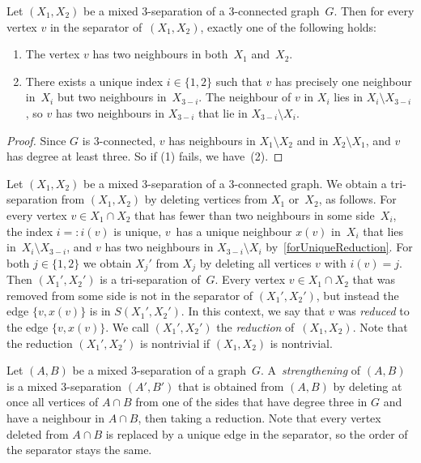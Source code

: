 \documentclass{aic}
\theoremstyle{plain}
\theoremstyle{definition}
\theoremstyle{plain}
\theoremstyle{plain}
\newcommand{\sm}{\setminus}
\begin{document}
\begin{lem}\label{forUniqueReduction}
    Let $(X_1,X_2)$ be a mixed 3-separation of a 3-connected graph~$G$.
    Then for every vertex $v$ in the separator of~$(X_1,X_2)$, exactly one of the following holds:
    \begin{enumerate}
        \item The vertex $v$ has two neighbours in both~$X_1$ and~$X_2$.
        \item There exists a unique index $i\in\{1,2\}$ such that $v$ has precisely one neighbour in~$X_i$ but two neighbours in~$X_{3-i}$.
        The neighbour of $v$ in $X_i$ lies in $X_i\sm X_{3-i}$, so $v$ has two neighbours in $X_{3-i}$ that lie in $X_{3-i}\sm X_i$.
    \end{enumerate}
\end{lem}
\begin{proof}
    Since $G$ is 3-connected, $v$ has neighbours in $X_1\sm X_2$ and in $X_2\sm X_1$, and $v$ has degree at least three.
    So if (1) fails, we have~(2).
\end{proof}

\begin{dfn}[Reduction]
Let $(X_1,X_2)$ be a mixed 3-separation of a 3-connected graph.
We obtain a tri-separation from $(X_1,X_2)$ by deleting vertices from $X_1$ or~$X_2$, as follows.
For every vertex $v\in X_1\cap X_2$ that has fewer than two neighbours in some side~$X_i$, the index $i=:i(v)$ is unique, $v$~has a unique neighbour $x(v)$ in~$X_i$ that lies in~$X_i\sm X_{3-i}$, and $v$ has two neighbours in $X_{3-i}\sm X_i$ by~\autoref{forUniqueReduction}.
For both $j\in\{1,2\}$ we obtain $X_j'$ from $X_j$ by deleting all vertices $v$ with $i(v)=j$.
Then $(X_1',X_2')$ is a tri-separation of~$G$.
Every vertex $v\in X_1\cap X_2$ that was removed from some side is not in the separator of $(X_1',X_2')$, but instead the edge $\{v,x(v)\}$ is in $S(X_1',X_2')$.
In this context, we say that $v$ was \emph{reduced} to the edge $\{v,x(v)\}$.
We call $(X_1',X_2')$ the \emph{reduction} of~$(X_1,X_2)$.
Note that the reduction $(X_1',X_2')$ is nontrivial if $(X_1,X_2)$ is nontrivial.
\end{dfn}

Let $(A,B)$ be a mixed 3-separation of a graph~$G$.
A~\emph{strengthening} of $(A,B)$ is a mixed 3-separation $(A',B')$ that is obtained from $(A,B)$ by deleting at once all vertices of $A\cap B$ from one of the sides that have degree three in $G$ and have a neighbour in $A\cap B$, then taking a reduction.
Note that every vertex deleted from $A\cap B$ is replaced by a unique edge in the separator, so the order of the separator stays the same.
\end{document}

